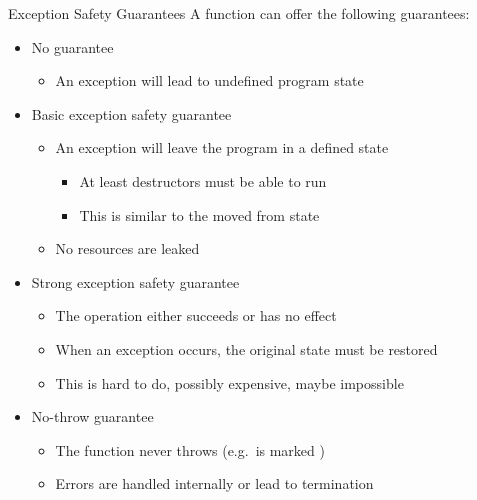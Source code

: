\begin{advanced}
\begin{frame}[fragile]
  \begin{block}{Exception Safety Guarantees}
    A function can offer the following guarantees:
    \begin{itemize}
      \item No guarantee
      \begin{itemize}
        \item An exception will lead to undefined program state
      \end{itemize}
      \item Basic exception safety guarantee
      \begin{itemize}
        \item An exception will leave the program in a defined state
        \begin{itemize}
          \item At least destructors must be able to run
          \item This is similar to the moved from state
        \end{itemize}
        \item No resources are leaked
      \end{itemize}
      \item Strong exception safety guarantee
      \begin{itemize}
        \item The operation either succeeds or has no effect
        \item When an exception occurs, the original state must be restored
        \item This is hard to do, possibly expensive, maybe impossible
      \end{itemize}
      \item No-throw guarantee
      \begin{itemize}
        \item The function never throws (e.g.\ is marked )
        \item Errors are handled internally or lead to termination
      \end{itemize}
    \end{itemize}
  \end{block}
\end{frame}


\end{advanced}
